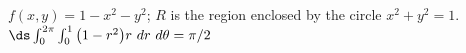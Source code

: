 {$f(x,y) = 1-x^2-y^2$; $R$ is the region enclosed by the circle $x^2+y^2=1$.
}
{$\ds \int_0^{2\pi}\int_{0}^{1} \big(1-r^2\big)r\ dr\ d\theta = \pi/2$
}